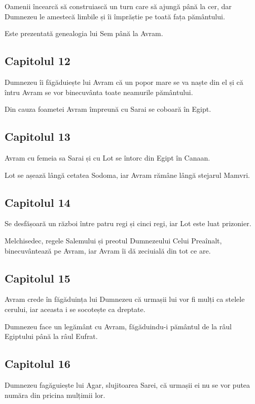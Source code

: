\documentclass[12pt,a4paper]{article}
\begin{document}
Oamenii încearcă să construiască un turn care să ajungă până la cer, dar Dumnezeu le amestecă limbile și îi împrăștie pe toată fața pământului.

Este prezentată genealogia lui Sem până la Avram.

\subsection{Capitolul 12}

Dumnezeu îi făgăduiește lui Avram că un popor mare se va naște din el și că întru Avram se vor binecuvânta toate neamurile pământului.

Din cauza foametei Avram împreună cu Sarai se coboară în Egipt.

\subsection{Capitolul 13}

Avram cu femeia sa Sarai și cu Lot se întorc din Egipt în Canaan.

Lot se așează lângă cetatea Sodoma, iar Avram rămâne lângă stejarul Mamvri.

\subsection{Capitolul 14}

Se desfășoară un război între patru regi și cinci regi, iar Lot este luat prizonier.

Melchisedec, regele Salemului și preotul Dumnezeului Celui Preaînalt, binecuvântează pe Avram, iar Avram îi dă zeciuială din tot ce are.

\subsection{Capitolul 15}

Avram crede în făgăduința lui Dumnezeu că urmașii lui vor fi mulți ca stelele cerului, iar aceasta i se socotește ca dreptate.

Dumnezeu face un legământ cu Avram, făgăduindu-i pământul de la râul Egiptului până la râul Eufrat.

\subsection{Capitolul 16}

Dumnezeu fagăguiește lui Agar, slujitoarea Sarei, că urmașii ei nu se vor
putea număra din pricina mulțimii lor.
\end{document}
